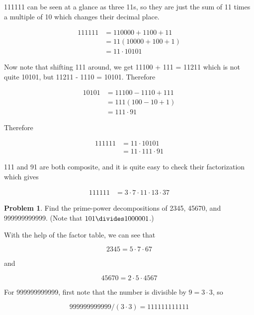 \documentclass{article}
\theoremstyle{definition}
\newtheorem{problem}{Problem}[section]
\begin{document}
  111111 can be seen at a glance as three 11s, so they are just the sum of 11
  times a multiple of 10 which changes their decimal place.
  
  \begin{align*}
    111111 &= 110000 + 1100 + 11 \\
    &= 11 (10000 + 100 + 1) \\
    &= 11 \cdot 10101
  \end{align*}
  
  Now note that shifting 111 around, we get 11100 + 111 = 11211 which is not
  quite 10101, but 11211 - 1110 = 10101. Therefore
  
  \begin{align*}
    10101 &= 11100 - 1110 + 111 \\
    &= 111 (100 - 10 + 1) \\
    &= 111 \cdot 91
  \end{align*}
  
  Therefore
  
  \begin{align*}
    111111 &= 11 \cdot 10101 \\
    &= 11 \cdot 111 \cdot 91
  \end{align*}
  
  111 and 91 are both composite, and it is quite easy to check their factorization which gives
  
  \begin{align*}
    111111 &= 3 \cdot 7 \cdot 11 \cdot 13 \cdot 37
  \end{align*}
  
  \begin{problem}
    Find the prime-power decompositions of 2345, 45670, and 999999999999.
    (Note that $101 \divides 1000001$.)
  \end{problem}
  
  With the help of the factor table, we can see that
  
  \begin{equation*}
    2345 = 5 \cdot 7 \cdot 67
  \end{equation*}
  
  and
  
  \begin{equation*}
    45670 = 2 \cdot 5 \cdot 4567
  \end{equation*}
  
  For 999999999999, first note that the number is divisible by $9 = 3 \cdot 3$, so
  
  \begin{equation*}
    999999999999 / (3 \cdot 3) = 111111111111
  \end{equation*}
  
\end{document}
